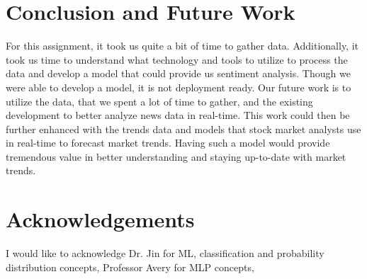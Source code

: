 \documentclass[twocolumn,12pt]{article}
\begin{document}
\begin{flushleft}
	\section{Conclusion and Future Work} \label{conclusion}

	For this assignment, it took us quite a bit of time to gather data. Additionally, it took us time to understand what technology and tools to utilize to process the data and develop a model that could provide us sentiment analysis. Though we were able to develop a model, it is not deployment ready. Our future work is to utilize the data, that we spent a lot of time to gather, and the existing development to better analyze news data in real-time. This work could then be further enhanced with the trends data and models that stock market analysts use in real-time to forecast market trends. Having such a model would provide tremendous value in better understanding and staying up-to-date with market trends.
	
	\section{Acknowledgements} \label{acknowledgements}
	I would like to acknowledge Dr. Jin \cite{rjin} for ML, classification and probability distribution concepts, Professor Avery \cite{avery} for MLP concepts, 




\end{flushleft}
\end{document}
